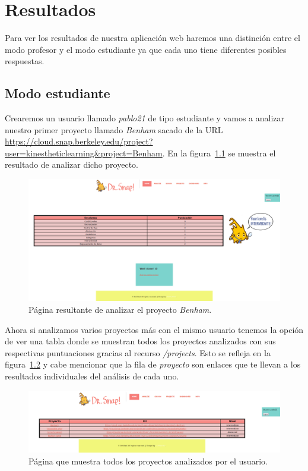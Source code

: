 \documentclass[a4paper, 12pt]{book}
\begin{document}
\cleardoublepage
\chapter{Resultados}

Para ver los resultados de nuestra aplicación web haremos una distinción entre el modo profesor y el modo estudiante ya que cada uno tiene diferentes posibles respuestas.
\section{Modo estudiante}
Crearemos un usuario llamado \textit{pablo21} de tipo estudiante y vamos a analizar nuestro primer proyecto llamado \textit{Benham} sacado de la URL \url{https://cloud.snap.berkeley.edu/project?user=kinestheticlearning&project=Benham}. En la figura~\ref{figura:Benham} se muestra el resultado de analizar dicho proyecto.

\begin{figure}[h]
            \centering
           \includegraphics[scale=0.25]{img/ej-estudiante.png}
            \caption{Página resultante de analizar el proyecto \textit{Benham}.}
             \label{figura:Benham}
        \end{figure}

Ahora si analizamos varios proyectos más con el mismo usuario tenemos la opción de ver una tabla donde se muestran todos los proyectos analizados con sus respectivas puntuaciones gracias al recurso \textit{/projects}. Esto se refleja en la figura~\ref{figura:project-es} y cabe mencionar que la fila de \textit{proyecto} son enlaces que te llevan a los resultados individuales del análisis de cada uno.

\begin{figure}[h]
            \centering
           \includegraphics[scale=0.3]{img/projects-estudiante.png}
            \caption{Página que muestra todos los proyectos analizados por el usuario.}
             \label{figura:project-es}
        \end{figure}
        
\end{document}
